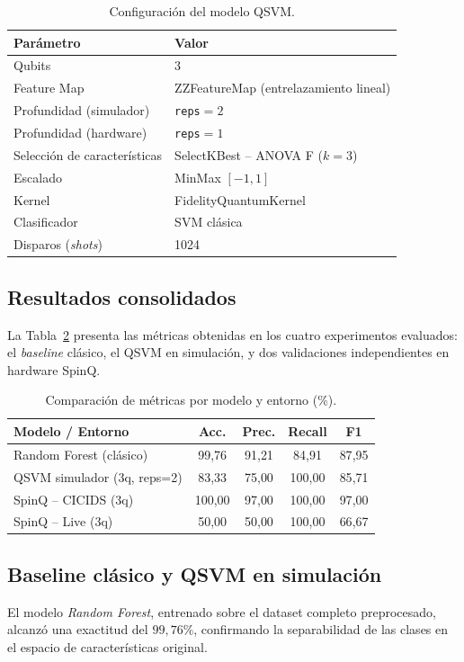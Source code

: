\documentclass[10pt,conference]{IEEEtran}
\begin{document}
\begin{table}[!t]
\centering
\caption{Configuración del modelo QSVM.}
\label{tab:config}
\begin{tabular}{@{}ll@{}}
\toprule
Parámetro & Valor \\
\midrule
Qubits & 3 \\
Feature Map & ZZFeatureMap (entrelazamiento lineal) \\
Profundidad (simulador) & \texttt{reps}$=2$ \\
Profundidad (hardware) & \texttt{reps}$=1$ \\
Selección de características & SelectKBest -- ANOVA F ($k=3$) \\
Escalado & MinMax $[-1,1]$ \\
Kernel & FidelityQuantumKernel \\
Clasificador & SVM clásica \\
Disparos (\textit{shots}) & 1024 \\
\bottomrule
\end{tabular}
\end{table}

\subsection{Resultados consolidados}
La Tabla~\ref{tab:resultados} presenta las métricas obtenidas en los
cuatro experimentos evaluados: el \textit{baseline} clásico, el QSVM en
simulación, y dos validaciones independientes en hardware SpinQ.

\begin{table}[!t]
\centering
\caption{Comparación de métricas por modelo y entorno (\%).}
\label{tab:resultados}
\begin{tabular}{@{}lcccc@{}}
\toprule
Modelo / Entorno & Acc. & Prec. & Recall & F1 \\
\midrule
Random Forest (clásico) & 99{,}76 & 91{,}21 & 84{,}91 & 87{,}95 \\
QSVM simulador (3q, reps=2) & 83{,}33 & 75{,}00 & 100{,}00 & 85{,}71 \\
SpinQ -- CICIDS (3q) & 100{,}00 & 97{,}00 & 100{,}00 & 97{,}00 \\
SpinQ -- Live (3q) & 50{,}00 & 50{,}00 & 100{,}00 & 66{,}67 \\
\bottomrule
\end{tabular}
\end{table}

\subsection{Baseline clásico y QSVM en simulación}
El modelo \textit{Random Forest}, entrenado sobre el dataset completo
preprocesado, alcanzó una exactitud del $99{,}76\%$, confirmando la
separabilidad de las clases en el espacio de características original.
\end{document}
